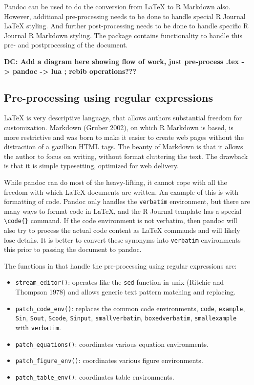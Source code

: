Pandoc can be used to do the conversion from LaTeX to R Markdown also. However, additional pre-processing needs to be done to handle special R Journal LaTeX styling. And further post-processing needs to be done to handle specific R Journal R Markdown styling. The  package contains functionality to handle this pre- and postprocessing of the document.

\textbf{DC: Add a diagram here showing flow of work, just pre-process .tex -\textgreater{} pandoc -\textgreater{} lua ; rebib operations???}

\hypertarget{pre-processing-using-regular-expressions}{%
\subsection{Pre-processing using regular expressions}\label{pre-processing-using-regular-expressions}}

LaTeX is very descriptive language, that allows authors substantial freedom for customization. Markdown (Gruber 2002), on which R Markdown is based, is more restrictive and was born to make it easier to create web pages without the distraction of a gazillion HTML tags. The beauty of Markdown is that it allows the author to focus on writing, without format cluttering the text. The drawback is that it is simple typesetting, optimized for web delivery.

While pandoc can do most of the heavy-lifting, it cannot cope with all the freedom with which LaTeX documents are written. An example of this is with formatting of code. Pandoc only handles the \texttt{verbatim} environment, but there are many ways to format code in LaTeX, and the R Journal template has a special \texttt{\textbackslash{}code\{\}} command. If the code environment is not verbatim, then pandoc will also try to process the actual code content as LaTeX commands and will likely lose details. It is better to convert these synonyms into \texttt{verbatim} environments this prior to passing the document to pandoc.

The functions in  that handle the pre-processing using regular expressions are:

\begin{itemize}
\tightlist
\item
  \texttt{stream\_editor()}: operates like the \texttt{sed} function in unix (Ritchie and Thompson 1978) and allows generic text pattern matching and replacing.
\item
  \texttt{patch\_code\_env()}: replaces the common code environments, \texttt{code}, \texttt{example}, \texttt{Sin}, \texttt{Sout}, \texttt{Scode}, \texttt{Sinput}, \texttt{smallverbatim}, \texttt{boxedverbatim}, \texttt{smallexample} with \texttt{verbatim}.
\item
  \texttt{patch\_equations()}: coordinates various equation environments.
\item
  \texttt{patch\_figure\_env()}: coordinates various figure environments.
\item
  \texttt{patch\_table\_env()}: coordinates table environments.
\end{itemize}

